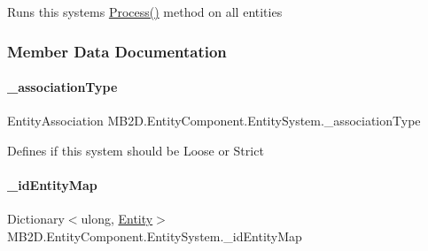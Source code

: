 Runs this systems \hyperlink{class_m_b2_d_1_1_entity_component_1_1_entity_system_abbf83b87cb5d12754fb058cef50451fa}{Process()} method on all entities 



\subsubsection{Member Data Documentation}
\hypertarget{class_m_b2_d_1_1_entity_component_1_1_entity_system_a1e5512e27d2cf3f40dcf8f39975ca1d7}{}\label{class_m_b2_d_1_1_entity_component_1_1_entity_system_a1e5512e27d2cf3f40dcf8f39975ca1d7} 
\paragraph{\texorpdfstring{\+\_\+association\+Type}{\_associationType}}
{\footnotesize\ttfamily Entity\+Association M\+B2\+D.\+Entity\+Component.\+Entity\+System.\+\_\+association\+Type\hspace{0.3cm}{\ttfamily [protected]}}



Defines if this system should be Loose or Strict 

\hypertarget{class_m_b2_d_1_1_entity_component_1_1_entity_system_a7415c4bff1132bb4dadcc1a072c663da}{}\label{class_m_b2_d_1_1_entity_component_1_1_entity_system_a7415c4bff1132bb4dadcc1a072c663da} 
\paragraph{\texorpdfstring{\+\_\+id\+Entity\+Map}{\_idEntityMap}}
{\footnotesize\ttfamily Dictionary$<$ulong, \hyperlink{class_m_b2_d_1_1_entity_component_1_1_entity}{Entity}$>$ M\+B2\+D.\+Entity\+Component.\+Entity\+System.\+\_\+id\+Entity\+Map\hspace{0.3cm}{\ttfamily [protected]}}




